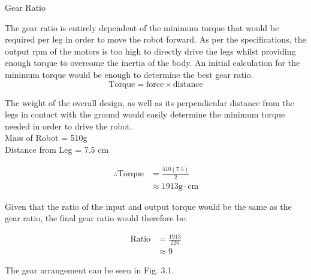 \begin{homeworkProblem}
\begin{homeworkSection}{Gear Ratio}

The gear ratio is entirely dependent of the minimum torque that would be required per leg in order to move the robot forward. As per the specifications, the output rpm of the motors is too high to directly drive the legs whilst providing enough torque to overcome the inertia of the body. An initial calculation for the minimum torque would be enough to determine the best gear ratio.\\

\begin{equation}
  \text{Torque} = \text{force}\times\text{distance}
\end{equation}

The weight of the overall design, as well as its perpendicular distance from the legs in contact with the ground would easily determine the minimum torque needed in order to drive the robot. \\

Mass of Robot = 510g \\
Distance from Leg = 7.5 cm

\begin{equation*}
\begin{split}
  \therefore \text{Torque} &= \frac{510\left(7.5\right)}{2}\\
                           &\approx 1913 \text{g}\cdot\text{cm}
\end{split}
\end{equation*}

Given that the ratio of the input and output torque would be the same as the gear ratio, the final gear ratio would therefore be:

\begin{equation*}
\begin{split}
  \text{Ratio} &= \frac{1913}{220} \\
               &\approx 9
\end{split}
\end{equation*}

The gear arrangement can be seen in Fig. 3.1. 

\end{homeworkSection}


\end{homeworkProblem}
